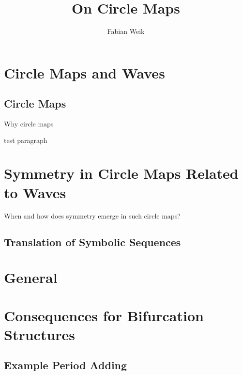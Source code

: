 \documentclass[12pt, twoside]{book}
\title{On Circle Maps}
\author{Fabian Weik}
\begin{document}
\maketitle

\tableofcontents

\chapter{Circle Maps and Waves}

\section{Circle Maps}

Why circle maps

test paragraph

\chapter{Symmetry in Circle Maps Related to Waves}

When and how does symmetry emerge in such circle maps?

\section{Translation of Symbolic Sequences}

\chapter{General}

\chapter{Consequences for Bifurcation Structures}

\section{Example Period Adding}
\end{document}
